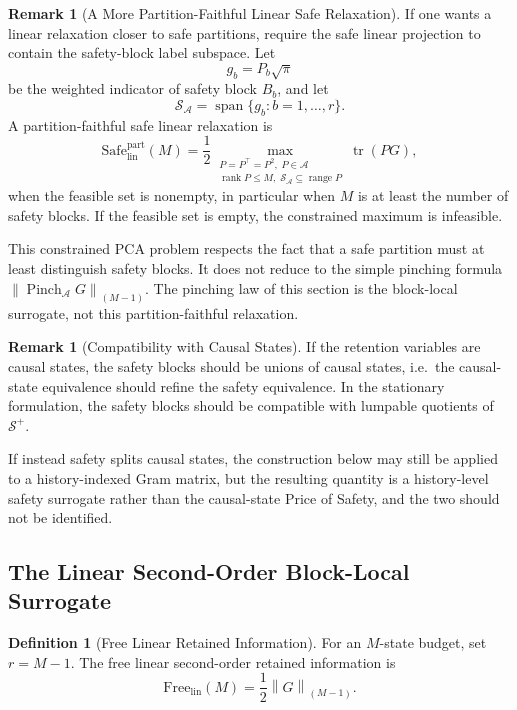 \documentclass[12pt]{article}
\theoremstyle{definition}
\newtheorem{definition}[theorem]{Definition}
\newtheorem{remark}[theorem]{Remark}
\DeclareMathOperator{\rank}{rank}
\DeclareMathOperator{\tr}{tr}
\newcommand{\EA}{\operatorname{Pinch}_{\mathcal A}}
\newcommand{\KyF}[2]{\left\|#1\right\|_{(#2)}}
\newcommand{\Splus}{\mathcal S^{+}}
\begin{document}
\begin{remark}[A More Partition-Faithful Linear Safe Relaxation]
\label{rem:partition-faithful}
If one wants a linear relaxation closer to safe partitions, require the safe
linear projection to contain the safety-block label subspace.  Let
\[
g_b=P_b\sqrt{\pi}
\]
be the weighted indicator of safety block $B_b$, and let
\[
\mathcal S_{\mathcal A}
=
\operatorname{span}\{g_b:b=1,\dots,r\}.
\]
A partition-faithful safe linear relaxation is
\[
\mathrm{Safe}_{\mathrm{lin}}^{\mathrm{part}}(M)
=
\frac12
\max_{\substack{
P=P^\top=P^2,\;P\in\mathcal A\\
\rank P\le M,\;
\mathcal S_{\mathcal A}\subseteq\operatorname{range}P
}}
\tr(PG),
\]
when the feasible set is nonempty, in particular when $M$ is at least the
number of safety blocks.  If the feasible set is empty, the constrained
maximum is infeasible.

This constrained PCA problem respects the fact that a safe partition must at
least distinguish safety blocks.  It does not reduce to the simple pinching
formula $\KyF{\EA G}{M-1}$.  The pinching law of this section is the
block-local surrogate, not this partition-faithful relaxation.
\end{remark}

\begin{remark}[Compatibility with Causal States]
\label{rem:pos-causal-compatibility}
If the retention variables are causal states, the safety blocks should be
unions of causal states, i.e.\ the causal-state equivalence should refine the
safety equivalence.  In the stationary formulation, the safety blocks should
be compatible with lumpable quotients of $\Splus$.

If instead safety splits causal states, the construction below may still be
applied to a history-indexed Gram matrix, but the resulting quantity is a
history-level safety surrogate rather than the causal-state Price of Safety,
and the two should not be identified.
\end{remark}

\subsection{The Linear Second-Order Block-Local Surrogate}
\label{subsec:pos-surrogate}

\begin{definition}[Free Linear Retained Information]
\label{def:free-linear}
For an $M$-state budget, set $r=M-1$.  The free linear second-order retained
information is
\[
\mathrm{Free}_{\mathrm{lin}}(M)
=
\frac12
\KyF{G}{M-1}.
\]
\end{definition}
\end{document}
